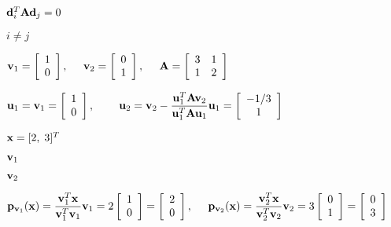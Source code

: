 \documentclass{article}
\def\lthtmlcheckvsize{\ifdim\ht\sizebox<\vsize 
  \ifdim\wd\sizebox<\hsize\expandafter\hfill\fi \expandafter\vfill
  \else\expandafter\vss\fi}%
\begin{document}
{\newpage\clearpage
{}%
$ {\bf d}_i^T{\bf A}{\bf d}_j=0$%
\lthtmlindisplaymathZ
\lthtmlcheckvsize\clearpage}

{\newpage\clearpage
{}%
$ i\ne j$%
\lthtmlindisplaymathZ
\lthtmlcheckvsize\clearpage}

{\newpage\clearpage
{}%
$\displaystyle {\bf v}_1=\left[\begin{array}{r}1\\0\end{array}\right],\;\;\;\;\;
{\bf v}_2=\left[\begin{array}{r}0\\1\end{array}\right],\;\;\;\;\;
{\bf A}=\left[\begin{array}{rr}3&1\\1&2\end{array}\right]$%
\lthtmlindisplaymathZ
\lthtmlcheckvsize\clearpage}

{\newpage\clearpage
{}%
$\displaystyle {\bf u}_1={\bf v}_1=\left[\begin{array}{r}1\\0\end{array}\right],
\;\;\;\;\;\;\;\;
{\bf u}_2={\bf v}_2-\frac{{\bf u}_1^T{\bf A}{\bf v}_2}{{\bf u}_1^T{\bf A}{\bf u}_1}{\bf u}_1
=\left[\begin{array}{c}-1/3\\1\end{array}\right]$%
\lthtmlindisplaymathZ
\lthtmlcheckvsize\clearpage}

{\newpage\clearpage
{}%
$ {\bf x}=[2,\;3]^T$%
\lthtmlindisplaymathZ
\lthtmlcheckvsize\clearpage}

{\newpage\clearpage
{}%
$ {\bf v}_1$%
\lthtmlindisplaymathZ
\lthtmlcheckvsize\clearpage}

{\newpage\clearpage
{}%
$ {\bf v}_2$%
\lthtmlindisplaymathZ
\lthtmlcheckvsize\clearpage}

{\newpage\clearpage
{}%
$\displaystyle {\bf p}_{{\bf v}_1}({\bf x})=\frac{{\bf v}_1^T{\bf x}}{{\bf v}_1^T{\bf v}_1}{\bf v}_1
=2\left[\begin{array}{c}1\\0\end{array}\right]
=\left[\begin{array}{c}2\\0\end{array}\right],\;\;\;\;\;
{\bf p}_{{\bf v}_2}({\bf x})=\frac{{\bf v}_2^T{\bf x}}{{\bf v}_2^T{\bf v}_2}{\bf v}_2
=3\left[\begin{array}{c}0\\1\end{array}\right]
=\left[\begin{array}{c}0\\3\end{array}\right]$%
\lthtmlindisplaymathZ
\lthtmlcheckvsize\clearpage}
\end{document}
